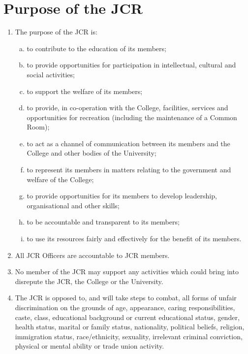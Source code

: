 \documentclass[12pt]{article}  %
\begin{document}
\section{Purpose of the JCR}
\begin{enumerate}
    \item The purpose of the JCR is:
    \begin{enumerate}[(a)]
        \item to contribute to the education of its members;
        \item to provide opportunities for participation in intellectual, cultural and social activities;
        \item to support the welfare of its members;
        \item to provide, in co-operation with the College, facilities, services and opportunities for recreation (including the maintenance of a Common Room);
        \item to act as a channel of communication between its members and the College and other bodies of the University;
        \item to represent its members in matters relating to the government and welfare of the College;
        \item to provide opportunities for its members to develop leadership, organisational and other skills;
        \item to be accountable and transparent to its members;
        \item to use its resources fairly and effectively for the benefit of its members.
    \end{enumerate}
    \item All JCR Officers are accountable to JCR members.
    \item No member of the JCR may support any activities which could bring into disrepute the JCR, the College or the University.
    \item The JCR is opposed to, and will take steps to combat, all forms of unfair discrimination on the grounds of age, appearance, caring responsibilities, caste, class, educational background or current educational status, gender, health status, marital or family status, nationality, political beliefs, religion, immigration status, race/ethnicity, sexuality, irrelevant criminal conviction, physical or mental ability or trade union activity.
\end{enumerate}
\newpage
\end{document}
